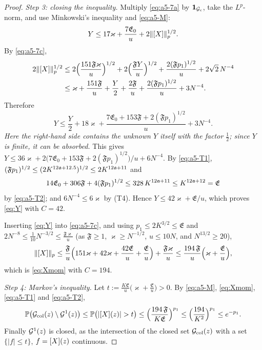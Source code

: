 \begin{proof}
\emph{Step 3: closing the inequality.} Multiply \eqref{eq:a5-7a} by $\mathbf{1}_{\mathcal{G}_{\rm c}}$, take the $L^p$-norm, and use Minkowski's inequality and \eqref{eq:a5-M}:
\[
 Y\le17\varkappa+\frac{7\mathfrak E_0}{u}+2\|[X]\|_p^{1/2}.
\]
By \eqref{eq:a5-7c},
\begin{align*}
 2\|[X]\|_p^{1/2}&\le2\Big(\frac{151\mathfrak F\varkappa}{u}\Big)^{1/2}+2\Big(\frac{\mathfrak FY}{u}\Big)^{1/2}+\frac{2(\mathfrak Fp_1)^{1/2}}{u}+2\sqrt2\,N^{-4}\\
 &\le\varkappa+\frac{151\mathfrak F}{u}+\frac Y2+\frac{2\mathfrak F}{u}+\frac{2(\mathfrak Fp_1)^{1/2}}{u}+3N^{-4}.
\end{align*}
Therefore
\[
 Y\le\frac Y2+18\varkappa+\frac{7\mathfrak E_0+153\mathfrak F+2(\mathfrak Fp_1)^{1/2}}{u}+3N^{-4}.
\]
\emph{Here the right-hand side contains the unknown $Y$ itself with the factor $\frac12$; since $Y$ is finite, it can be absorbed.} This gives $Y\le36\varkappa+2\big(7\mathfrak E_0+153\mathfrak F+2(\mathfrak Fp_1)^{1/2}\big)/u+6N^{-4}$.
By \eqref{eq:a5-T1}, $(\mathfrak Fp_1)^{1/2}\le(2K^{12\mathfrak{a}+12.5})^{1/2}\le2K^{12\mathfrak{a}+11}$ and
\[
 14\mathfrak E_0+306\mathfrak F+4(\mathfrak Fp_1)^{1/2}\le328\,K^{12\mathfrak{a}+11}\le K^{12\mathfrak{a}+12}=\mathfrak E
\]
by \eqref{eq:a5-T2}; and $6N^{-4}\le6\varkappa$ by (T4). Hence $Y\le42\varkappa+\mathfrak E/u$, which proves \eqref{eq:Y} with $C=42$.

Inserting \eqref{eq:Y} into \eqref{eq:a5-7c}, and using $p_1\le2K^{3/2}\le\mathfrak E$ and $2N^{-8}\le\frac{1}{10}N^{-3/2}\le\frac{\mathfrak F\varkappa}{u}$ (as $\mathfrak F\ge1$, $\varkappa\ge N^{-1/2}$, $u\le10N$, and $N^{13/2}\ge20$),
\[
 \|[X]\|_p\le\frac{\mathfrak F}{u}\Big(151\varkappa+42\varkappa+\frac{42\mathfrak E}{u}+\frac{\mathfrak E}{u}\Big)+\frac{\mathfrak F\varkappa}{u}\le\frac{194\,\mathfrak F}{u}\Big(\varkappa+\frac{\mathfrak E}u\Big),
\]
which is \eqref{eq:Xmom} with $C=194$.

\emph{Step 4: Markov's inequality.} Let $t:=\frac{K\mathfrak E}{u}\big(\varkappa+\frac{\mathfrak E}u\big)>0$. By \eqref{eq:a5-M}, \eqref{eq:Xmom}, \eqref{eq:a5-T1} and \eqref{eq:a5-T2},
\[
 \PP\big(\cG_{\rm col}(z)\setminus\cG^1(z)\big)\le\PP\big(|\avg X(z)|>t\big)\le\Big(\frac{194\,\mathfrak F}{K\mathfrak E}\Big)^{p_1}\le\Big(\frac{194}{K^2}\Big)^{p_1}\le e^{-p_1}.
\]
Finally $\mathcal{G}^1(z)$ is closed, as the intersection of the closed set $\mathcal{G}_{\rm col}(z)$ with a set $\{|f|\le t\}$, $f=[X](z)$ continuous.
\end{proof}

